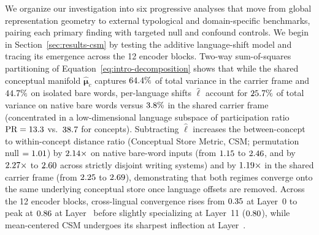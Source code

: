 We organize our investigation into six progressive analyses that move from global representation geometry to external typological and domain-specific benchmarks, pairing each primary finding with targeted null and confound controls.
We begin in Section~\ref{sec:results-csm} by testing the additive language-shift model and tracing its emergence across the 12 encoder blocks.
Two-way sum-of-squares partitioning of Equation~\ref{eq:intro-decomposition} shows that while the shared conceptual manifold $\hat{\boldsymbol{\mu}}_c$ captures $64.4{}\%$ of total variance in the carrier frame and $44.7{}\%$ on isolated bare words, per-language shifts $\hat{\boldsymbol{\ell}}$ account for $25.7{}\%$ of total variance on native bare words versus $3.8{}\%$ in the shared carrier frame (concentrated in a low-dimensional language subspace of participation ratio $\text{PR} = 13.3{}$ vs.\ $38.7{}$ for concepts).
Subtracting $\hat{\boldsymbol{\ell}}$ increases the between-concept to within-concept distance ratio (Conceptual Store Metric, CSM; permutation null $= 1.01{}$) by $2.14{}\times$ on native bare-word inputs (from $1.15{}$ to $2.46{}$, and by $2.27{}\times$ to $2.60{}$ across strictly disjoint writing systems) and by $1.19{}\times$ in the shared carrier frame (from $2.25{}$ to $2.69{}$), demonstrating that both regimes converge onto the same underlying conceptual store once language offsets are removed.
Across the 12 encoder blocks, cross-lingual convergence rises from $0.35{}$ at Layer~0 to peak at $0.86{}$ at Layer~\LayerwisePeakLayer{} before slightly specializing at Layer~11 ($0.80{}$), while mean-centered CSM undergoes its sharpest inflection at Layer~\LayerwisePhaseTrans{}.

